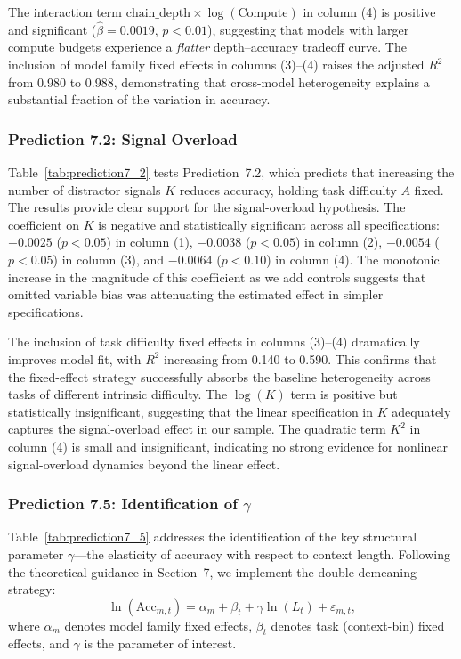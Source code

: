 The interaction term $\text{chain\_depth} \times \log(\text{Compute})$ in column (4) is positive and significant ($\hat{\beta} = 0.0019$, $p{<}0.01$), suggesting that models with larger compute budgets experience a \emph{flatter} depth--accuracy tradeoff curve. The inclusion of model family fixed effects in columns (3)--(4) raises the adjusted $R^2$ from 0.980 to 0.988, demonstrating that cross-model heterogeneity explains a substantial fraction of the variation in accuracy.

\subsubsection{Prediction 7.2: Signal Overload}

Table~\ref{tab:prediction7_2} tests Prediction~7.2, which predicts that increasing the number of distractor signals $K$ reduces accuracy, holding task difficulty $A$ fixed. The results provide clear support for the signal-overload hypothesis. The coefficient on $K$ is negative and statistically significant across all specifications: $-0.0025$ ($p{<}0.05$) in column (1), $-0.0038$ ($p{<}0.05$) in column (2), $-0.0054$ ($p{<}0.05$) in column (3), and $-0.0064$ ($p{<}0.10$) in column (4). The monotonic increase in the magnitude of this coefficient as we add controls suggests that omitted variable bias was attenuating the estimated effect in simpler specifications.

The inclusion of task difficulty fixed effects in columns (3)--(4) dramatically improves model fit, with $R^2$ increasing from 0.140 to 0.590. This confirms that the fixed-effect strategy successfully absorbs the baseline heterogeneity across tasks of different intrinsic difficulty. The $\log(K)$ term is positive but statistically insignificant, suggesting that the linear specification in $K$ adequately captures the signal-overload effect in our sample. The quadratic term $K^2$ in column (4) is small and insignificant, indicating no strong evidence for nonlinear signal-overload dynamics beyond the linear effect.

\subsubsection{Prediction 7.5: Identification of $\gamma$}

Table~\ref{tab:prediction7_5} addresses the identification of the key structural parameter $\gamma$---the elasticity of accuracy with respect to context length. Following the theoretical guidance in Section~7, we implement the double-demeaning strategy:
\begin{equation}
\ln(\text{Acc}_{m,t}) = \alpha_m + \beta_t + \gamma \ln(L_t) + \varepsilon_{m,t},
\end{equation}
where $\alpha_m$ denotes model family fixed effects, $\beta_t$ denotes task (context-bin) fixed effects, and $\gamma$ is the parameter of interest.


